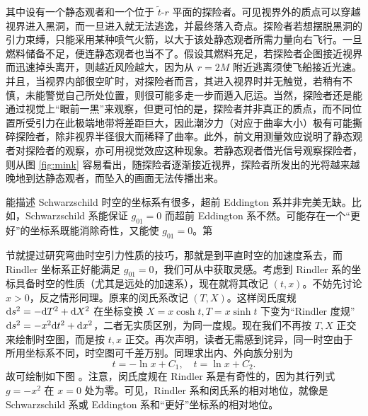 其中设有一个静态观者和一个位于 $\tilde t$-$r$ 平面的探险者。可见视界外的质点可以穿越视界进入黑洞，而一旦进入就无法逃逸，并最终落入奇点。探险者若想摆脱黑洞的引力束缚，只能采用某种喷气火箭，以大于该处静态观者所需力量向右飞行。一旦燃料储备不足，便连静态观者也当不了。假设其燃料充足，若探险者企图接近视界而迅速掉头离开，则越近风险越大，因为从 $r=2M$ 附近逃离须使飞船接近光速。并且，当视界内部很空旷时，对探险者而言，其进入视界时并无触觉，若稍有不慎，未能警觉自己所处位置，则很可能多走一步而遁入厄运。当然，探险者还是能通过视觉上“眼前一黑”来观察，但更可怕的是，探险者并非真正的质点，而不同位置所受引力在此极端地带将差距巨大，因此潮汐力（对应于曲率大小）极有可能撕碎探险者，除非视界半径很大而稀释了曲率。此外，前文用测量效应说明了静态观者对探险者的观察，亦可用视觉效应这种现象。若静态观者借光信号观察探险者，则从图 \ref{fig:mink} 容易看出，随探险者逐渐接近视界，探险者所发出的光将越来越晚地到达静态观者，而坠入的画面无法传播出来。

能描述 Schwarzschild 时空的坐标系有很多，超前 Eddington 系并非完美无缺。比如，Schwarzschild 系能保证 $g_{01}=0$ 而超前 Eddington 系不然。可能存在一个“更好”的坐标系既能消除奇性，又能使 $g_{01}=0$。第 

节就提过研究弯曲时空引力性质的技巧，那就是到平直时空的加速度系去，而 Rindler 坐标系正好能满足 $g_{01}=0$，我们可从中获取灵感。考虑到 Rindler 系的坐标具备时空的性质（尤其是远处的加速系），现在就将其改记 $(t,x)$。不妨先讨论 $x>0$，反之情形同理。原来的闵氏系改记 $(T,X)$。这样闵氏度规 $\dd s^2=-\dd T^2+\dd X^2$ 在坐标变换 $X=x\cosh t,T=x\sinh t$ 下变为“Rindler 度规” $\dd s^2=-x^2\dd t^2+\dd x^2$，二者无实质区别，为同一度规。现在我们不再按 $T,X$ 正交来绘制时空图，而是按 $t,x$ 正交。再次声明，读者无需感到诧异，同一时空由于所用坐标系不同，时空图可千差万别。同理求出内、外向族分别为
\[
t=-\ln x+C_1,\quad t=\ln x+C_2.
\]
故可绘制如下图 。注意，闵氏度规在 Rindler 系是有奇性的，因为其行列式 $g=-x^2$ 在 $x=0$ 处为零。可见，Rindler 系和闵氏系的相对地位，就像是 Schwarzschild 系或 Eddington 系和“更好”坐标系的相对地位。


